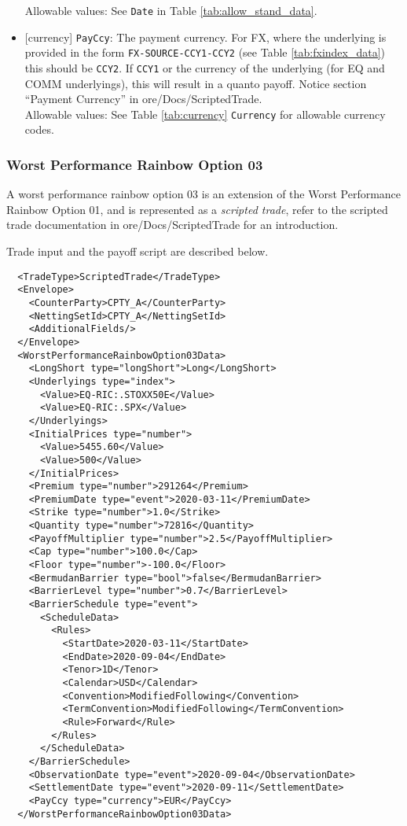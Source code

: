\begin{itemize}
  Allowable values: See \lstinline!Date! in Table \ref{tab:allow_stand_data}.
  \item{}[currency] \lstinline!PayCcy!: The payment currency. For FX, where the underlying is provided
      in the form \lstinline!FX-SOURCE-CCY1-CCY2! (see Table \ref{tab:fxindex_data}) this should
      be \lstinline!CCY2!. If \lstinline!CCY1! or the currency of the underlying (for EQ and
      COMM underlyings), this will result in a quanto payoff. Notice section ``Payment Currency'' in ore/Docs/ScriptedTrade. \\
        Allowable values: See Table \ref{tab:currency} \lstinline!Currency! for allowable currency codes.
\end{itemize}

\subsubsection*{Worst Performance Rainbow Option 03}

A worst performance rainbow option 03 is an extension of the Worst Performance Rainbow Option 01, and is
represented as a {\em scripted trade},
refer to the scripted trade documentation in ore/Docs/ScriptedTrade
for an introduction.

Trade input and the payoff script are described below.

\begin{verbatim}
  <TradeType>ScriptedTrade</TradeType>
  <Envelope>
    <CounterParty>CPTY_A</CounterParty>
    <NettingSetId>CPTY_A</NettingSetId>
    <AdditionalFields/>
  </Envelope>
  <WorstPerformanceRainbowOption03Data>
    <LongShort type="longShort">Long</LongShort>
    <Underlyings type="index">
      <Value>EQ-RIC:.STOXX50E</Value>
      <Value>EQ-RIC:.SPX</Value>
    </Underlyings>
    <InitialPrices type="number">
      <Value>5455.60</Value>
      <Value>500</Value>
    </InitialPrices>
    <Premium type="number">291264</Premium>
    <PremiumDate type="event">2020-03-11</PremiumDate>
    <Strike type="number">1.0</Strike>
    <Quantity type="number">72816</Quantity>
    <PayoffMultiplier type="number">2.5</PayoffMultiplier>
    <Cap type="number">100.0</Cap>
    <Floor type="number">-100.0</Floor>
    <BermudanBarrier type="bool">false</BermudanBarrier>
    <BarrierLevel type="number">0.7</BarrierLevel>
    <BarrierSchedule type="event">
      <ScheduleData>
        <Rules>
          <StartDate>2020-03-11</StartDate>
          <EndDate>2020-09-04</EndDate>
          <Tenor>1D</Tenor>
          <Calendar>USD</Calendar>
          <Convention>ModifiedFollowing</Convention>
          <TermConvention>ModifiedFollowing</TermConvention>
          <Rule>Forward</Rule>
        </Rules>
      </ScheduleData>
    </BarrierSchedule>
    <ObservationDate type="event">2020-09-04</ObservationDate>
    <SettlementDate type="event">2020-09-11</SettlementDate>
    <PayCcy type="currency">EUR</PayCcy>
  </WorstPerformanceRainbowOption03Data>
\end{verbatim}

